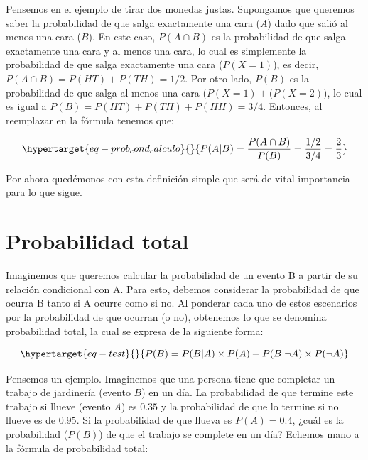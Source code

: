 \documentclass[
  letterpaper,
  DIV=11,
  numbers=noendperiod,
  oneside]{scrreprt}
\begin{document}
Pensemos en el ejemplo de tirar dos monedas justas. Supongamos que
queremos saber la probabilidad de que salga exactamente una cara (\(A\))
dado que salió al menos una cara (\(B\)). En este caso, \(P(A \cap B)\)
es la probabilidad de que salga exactamente una cara y al menos una
cara, lo cual es simplemente la probabilidad de que salga exactamente
una cara (\(P(X=1)\)), es decir, \(P(A \cap B) = P(HT) + P(TH) = 1/2\).
Por otro lado, \(P(B)\) es la probabilidad de que salga al menos una
cara (\(P(X=1)+(P(X=2)\)), lo cual es igual a
\(P(B) = P(HT) + P(TH) + P(HH) = 3/4\). Entonces, al reemplazar en la
fórmula tenemos que:

\begin{equation}\protect\hypertarget{eq-prob_cond_calculo}{}{
P(A|B) = \frac{P(A \cap B)}{P(B)} = \frac{1/2}{3/4} = \frac{2}{3}
}\label{eq-prob_cond_calculo}\end{equation}

Por ahora quedémonos con esta definición simple que será de vital
importancia para lo que sigue.

\hypertarget{probabilidad-total}{%
\section{Probabilidad total}\label{probabilidad-total}}

Imaginemos que queremos calcular la probabilidad de un evento B a partir
de su relación condicional con A. Para esto, debemos considerar la
probabilidad de que ocurra B tanto si A ocurre como si no. Al ponderar
cada uno de estos escenarios por la probabilidad de que ocurran (o no),
obtenemos lo que se denomina probabilidad total, la cual se expresa de
la siguiente forma:

\begin{equation}\protect\hypertarget{eq-test}{}{
P(B) = P(B|A) \times P(A) +  P(B|\neg A) \times P(\neg A)
}\label{eq-test}\end{equation}

Pensemos un ejemplo. Imaginemos que una persona tiene que completar un
trabajo de jardinería (evento \(B\)) en un día. La probabilidad de que
termine este trabajo si llueve (evento \(A\)) es \(0.35\) y la
probabilidad de que lo termine si no llueve es de \(0.95\). Si la
probabilidad de que llueva es \(P(A)= 0.4\), ¿cuál es la probabilidad
(\(P(B)\)) de que el trabajo se complete en un día? Echemos mano a la
fórmula de probabilidad total:
\end{document}
